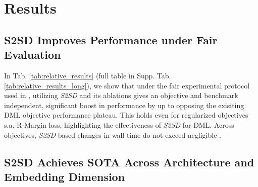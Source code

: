 \documentclass{article} \usepackage{arxiv_style,times}
\begin{document}
 



 
\section{Results}
\subsection{S2SD Improves Performance under Fair Evaluation} \label{sec:baselines}
In Tab. \ref{tab:relative_results} (full table in Supp. Tab. \ref{tab:relative_results_long}), we show that under the fair experimental protocol used in \cite{roth2020revisiting}, utilizing \textit{S2SD} and its ablations gives an objective and benchmark independent, significant boost in performance by up to  opposing the exisiting DML objective performance plateau. This holds even for regularized objectives s.a. R-Margin loss, highlighting the effectiveness of \textit{S2SD} for DML. Across objectives, \textit{S2SD}-based changes in wall-time do not exceed negligible . 


\subsection{S2SD Achieves SOTA Across Architecture and Embedding Dimension} 
\label{sec:comp}
\end{document}
